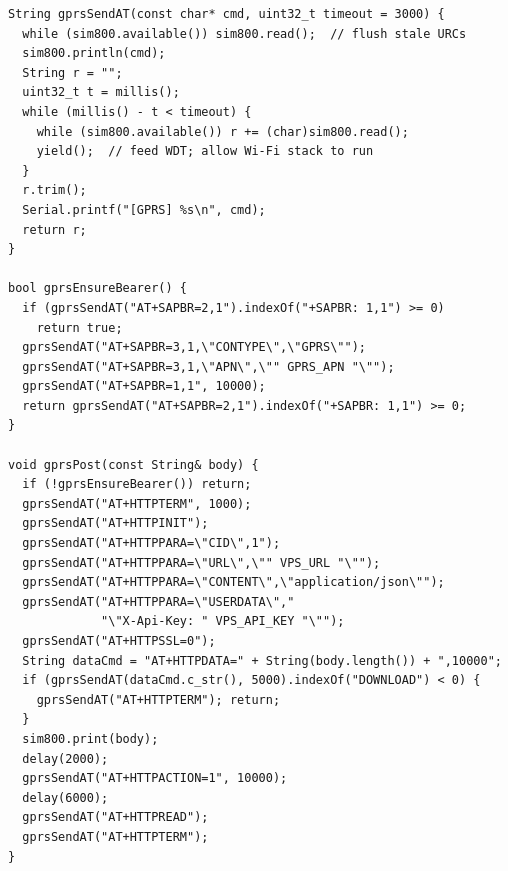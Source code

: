 \begin{lstlisting}[caption={GPRS AT-command helpers and HTTP POST}, label={lst:fw-gprs}]
String gprsSendAT(const char* cmd, uint32_t timeout = 3000) {
  while (sim800.available()) sim800.read();  // flush stale URCs
  sim800.println(cmd);
  String r = "";
  uint32_t t = millis();
  while (millis() - t < timeout) {
    while (sim800.available()) r += (char)sim800.read();
    yield();  // feed WDT; allow Wi-Fi stack to run
  }
  r.trim();
  Serial.printf("[GPRS] %s\n", cmd);
  return r;
}

bool gprsEnsureBearer() {
  if (gprsSendAT("AT+SAPBR=2,1").indexOf("+SAPBR: 1,1") >= 0)
    return true;
  gprsSendAT("AT+SAPBR=3,1,\"CONTYPE\",\"GPRS\"");
  gprsSendAT("AT+SAPBR=3,1,\"APN\",\"" GPRS_APN "\"");
  gprsSendAT("AT+SAPBR=1,1", 10000);
  return gprsSendAT("AT+SAPBR=2,1").indexOf("+SAPBR: 1,1") >= 0;
}

void gprsPost(const String& body) {
  if (!gprsEnsureBearer()) return;
  gprsSendAT("AT+HTTPTERM", 1000);
  gprsSendAT("AT+HTTPINIT");
  gprsSendAT("AT+HTTPPARA=\"CID\",1");
  gprsSendAT("AT+HTTPPARA=\"URL\",\"" VPS_URL "\"");
  gprsSendAT("AT+HTTPPARA=\"CONTENT\",\"application/json\"");
  gprsSendAT("AT+HTTPPARA=\"USERDATA\","
             "\"X-Api-Key: " VPS_API_KEY "\"");
  gprsSendAT("AT+HTTPSSL=0");
  String dataCmd = "AT+HTTPDATA=" + String(body.length()) + ",10000";
  if (gprsSendAT(dataCmd.c_str(), 5000).indexOf("DOWNLOAD") < 0) {
    gprsSendAT("AT+HTTPTERM"); return;
  }
  sim800.print(body);
  delay(2000);
  gprsSendAT("AT+HTTPACTION=1", 10000);
  delay(6000);
  gprsSendAT("AT+HTTPREAD");
  gprsSendAT("AT+HTTPTERM");
}
\end{lstlisting}

